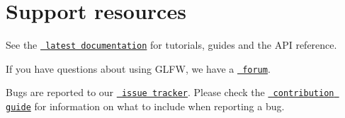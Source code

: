 \chapter{Support resources}
\hypertarget{md_src_2glfw_2docs_2SUPPORT}{}\label{md_src_2glfw_2docs_2SUPPORT}
\label{md_src_2glfw_2docs_2SUPPORT_autotoc_md22}%
%
 See the \href{https://www.glfw.org/docs/latest/}{\texttt{ latest documentation}} for tutorials, guides and the API reference.

If you have questions about using GLFW, we have a \href{https://discourse.glfw.org/}{\texttt{ forum}}.

Bugs are reported to our \href{https://github.com/glfw/glfw/issues}{\texttt{ issue tracker}}. Please check the \href{https://github.com/glfw/glfw/blob/master/docs/CONTRIBUTING.md}{\texttt{ contribution guide}} for information on what to include when reporting a bug. 